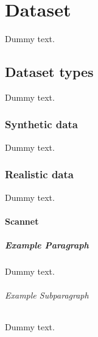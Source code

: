 \chapter{Dataset}

Dummy text.

\section{Dataset types}

Dummy text.

\subsection{Synthetic data}

Dummy text.

\subsection{Realistic data}

Dummy text.

\subsubsection{Scannet}




\paragraph{Example Paragraph}

Dummy text.

\subparagraph{Example Subparagraph}

Dummy text.
